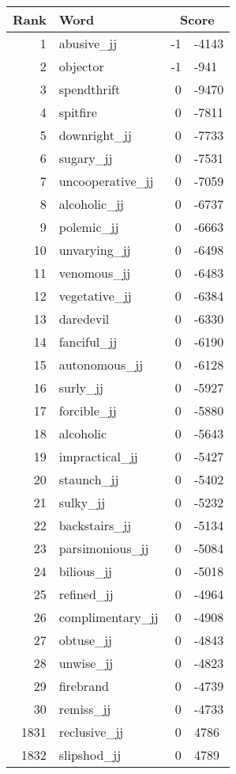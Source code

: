 \begin{longtable}[!htbp]{| rlr@{.}l |}
    \hline
    \textbf{Rank} & \textbf{Word} & \multicolumn{2}{c|}{\textbf{Score}} \\
    \hline
    \endhead
    1 & abusive\_jj & -1 & -4143 \\
    2 & objector & -1 & -941 \\
    3 & spendthrift & 0 & -9470 \\
    4 & spitfire & 0 & -7811 \\
    5 & downright\_jj & 0 & -7733 \\
    6 & sugary\_jj & 0 & -7531 \\
    7 & uncooperative\_jj & 0 & -7059 \\
    8 & alcoholic\_jj & 0 & -6737 \\
    9 & polemic\_jj & 0 & -6663 \\
    10 & unvarying\_jj & 0 & -6498 \\
    11 & venomous\_jj & 0 & -6483 \\
    12 & vegetative\_jj & 0 & -6384 \\
    13 & daredevil & 0 & -6330 \\
    14 & fanciful\_jj & 0 & -6190 \\
    15 & autonomous\_jj & 0 & -6128 \\
    16 & surly\_jj & 0 & -5927 \\
    17 & forcible\_jj & 0 & -5880 \\
    18 & alcoholic & 0 & -5643 \\
    19 & impractical\_jj & 0 & -5427 \\
    20 & staunch\_jj & 0 & -5402 \\
    21 & sulky\_jj & 0 & -5232 \\
    22 & backstairs\_jj & 0 & -5134 \\
    23 & parsimonious\_jj & 0 & -5084 \\
    24 & bilious\_jj & 0 & -5018 \\
    25 & refined\_jj & 0 & -4964 \\
    26 & complimentary\_jj & 0 & -4908 \\
    27 & obtuse\_jj & 0 & -4843 \\
    28 & unwise\_jj & 0 & -4823 \\
    29 & firebrand & 0 & -4739 \\
    30 & remiss\_jj & 0 & -4733 \\
    1831 & reclusive\_jj & 0 & 4786 \\
    1832 & slipshod\_jj & 0 & 4789 \\

\end{longtable}
